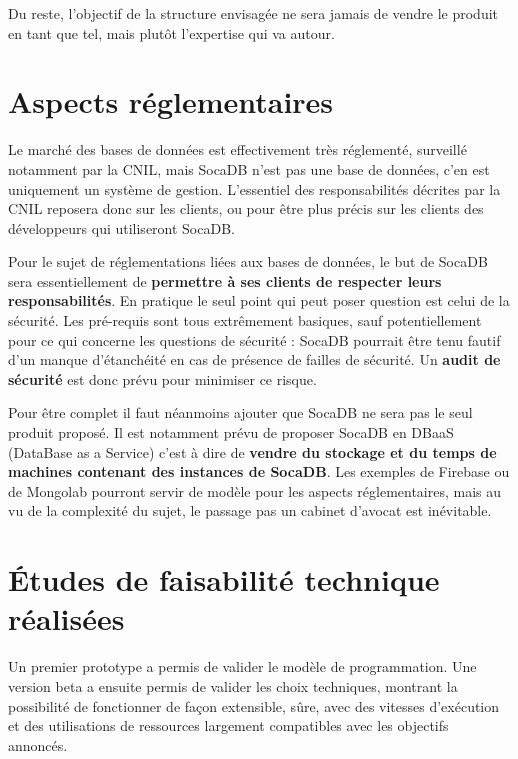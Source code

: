 \documentclass[a4paper,10pt]{scrreprt}
\begin{document}
            \medskip
            Du reste, l'objectif de la structure envisagée ne sera jamais de vendre le produit en tant que tel, mais plutôt l'expertise qui va autour.

    \section{Aspects réglementaires}

        Le marché des bases de données est effectivement très réglementé, surveillé notamment par la CNIL, mais SocaDB n'est pas une base de données, c'en est uniquement un système de gestion. L'essentiel des responsabilités décrites par la CNIL reposera donc sur les clients, ou pour être plus précis sur les clients des développeurs qui utiliseront SocaDB.
        
        Pour le sujet de réglementations liées aux bases de données, le but de SocaDB sera essentiellement de \textbf{permettre à ses clients de respecter leurs responsabilités}. En pratique le seul point qui peut poser question est celui de la sécurité. Les pré-requis sont tous extrêmement basiques, sauf potentiellement pour ce qui concerne les questions de sécurité : SocaDB pourrait être tenu fautif d'un manque d'étanchéité en cas de présence de failles de sécurité. Un \textbf{audit de sécurité} est donc prévu pour minimiser ce risque.
        
        \medskip
        Pour être complet il faut néanmoins ajouter que SocaDB ne sera pas le seul produit proposé. Il est notamment prévu de proposer SocaDB en DBaaS (DataBase as a Service) c'est à dire de \textbf{vendre du stockage et du temps de machines contenant des instances de SocaDB}. Les exemples de Firebase ou de Mongolab pourront servir de modèle pour les aspects réglementaires, mais au vu de la complexité du sujet, le passage pas un cabinet d'avocat est inévitable.
        
    \section{Études de faisabilité technique réalisées}

        Un premier prototype a permis de valider le modèle de programmation. Une version beta a ensuite permis de valider les choix techniques, montrant la possibilité de fonctionner de façon extensible, sûre, avec des vitesses d'exécution et des utilisations de ressources largement compatibles avec les objectifs annoncés.
\end{document}
